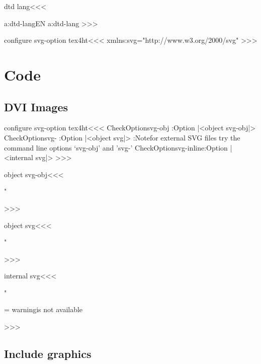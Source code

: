 \<dtd lang\><<<
\expandafter
\ifx \csname a:dtd-lang\endcsname\relax EN\else
  \csname a:dtd-lang\endcsname
\fi
>>>

\<configure svg-option tex4ht\><<<    
  {\Hnewline xmlns:svg="http://www.w3.org/2000/svg"\Hnewline }
\fi
>>>



\chapter{Code}

\section{DVI Images}





\<configure svg-option tex4ht\><<<    
\:CheckOption{svg-obj} \if:Option 
   |<object svg-obj|>
\else   \:CheckOption{svg-} \if:Option 
      |<object svg|>
\else 
      \Log:Note{for external SVG files
             try the command line options `svg-obj' and 'svg-'}
\:CheckOption{svg-inline}\if:Option
      |<internal svg|>
\fi
\fi\fi
>>>



\<object svg-obj\><<<
  {}
  {}
  {" }
  {}
  {}
>>>





\<object svg\><<<
  {}
  {}
  {" }
  {}
  {}
>>>


\<internal svg\><<<
  {}
  {}
  {" }
  {}
  {%
   =\PictureFile \relax
     \:warning{\PictureFile\space is not available}%
   \else     {}  \fi
  }
>>>




\section{Include graphics}

